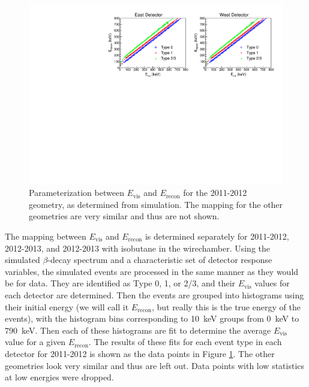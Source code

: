 \begin{figure}[h]
  \centering
  \includegraphics[scale=0.78]{3-UCNAAnalysis/2011-2012_Evis_to_Erecon.pdf}
  \caption{Parameterization between $E_{\mathrm{vis}}$ and $E_{\mathrm{recon}}$ for the 
    2011-2012 geometry, as determined from simulation.
    The mapping for the other geometries are very similar and thus are
    not shown.}
  \label{fig:Erecon}
\end{figure}

The mapping between $E_{\mathrm{vis}}$ and $E_{\mathrm{recon}}$ is determined separately
for 2011-2012, 2012-2013, and 2012-2013 with isobutane in the wirechamber.
Using the simulated $\beta$-decay spectrum and a characteristic set of detector
response variables, the simulated events are processed in the same manner as
they would be for data. They are identified as Type 0, 1, or 2/3, and their
$E_{\mathrm{vis}}$ values for each detector are determined. Then the events are
grouped into histograms using their initial energy (we will call it $E_{\mathrm{recon}}$,
but really this is the true energy of the events), with the histogram bins corresponding
to 10~keV groups from 0~keV to 790~keV. Then each of these histograms are fit to
determine the average $E_{\mathrm{vis}}$ value for a given $E_{\mathrm{recon}}$. The results
of these fits for each event type in each detector for 2011-2012 is shown as the data
points in Figure \ref{fig:Erecon}. The other geometries look very similar and thus are
left out. Data points with low statistics at low energies were dropped.

